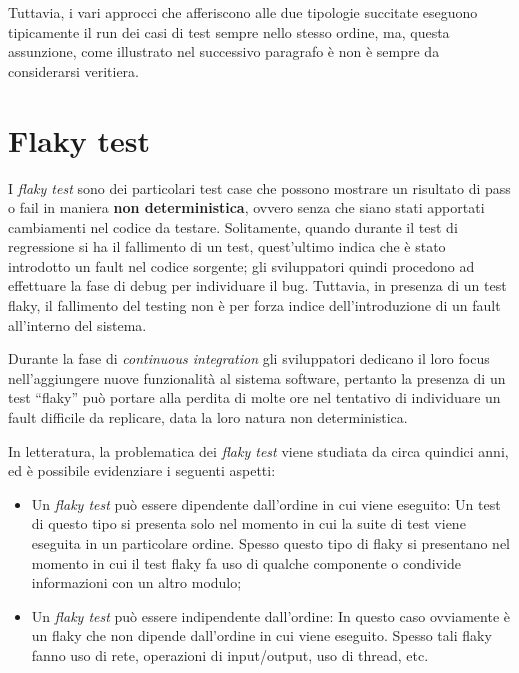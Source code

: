 Tuttavia, i vari approcci che afferiscono alle due tipologie succitate eseguono tipicamente il run dei casi di test sempre nello stesso ordine, ma, questa assunzione, come illustrato nel successivo paragrafo è non è sempre da considerarsi veritiera.
\section{Flaky test}
I \emph{flaky test} sono dei particolari test case che possono mostrare un risultato di pass o fail in maniera \textbf{non deterministica}, ovvero senza che siano stati apportati cambiamenti nel codice da testare.\cite{shi2019ifixflakies} Solitamente, quando durante il test di regressione si ha il fallimento di un test, quest’ultimo indica che è stato introdotto
un fault nel codice sorgente; gli sviluppatori quindi procedono ad effettuare la fase
di debug per individuare il bug. Tuttavia, in presenza di un test flaky, il fallimento del testing non è per forza indice dell’introduzione di un fault all’interno del
sistema.

Durante la fase di \emph{continuous integration} gli sviluppatori dedicano il loro focus nell’aggiungere nuove funzionalità al sistema software, pertanto la presenza
di un test “flaky” può portare alla perdita di molte ore nel tentativo di individuare
un fault difficile da replicare, data la loro natura non deterministica.

In letteratura, la problematica dei \emph{flaky test} viene studiata da circa quindici anni, ed è possibile evidenziare i seguenti aspetti:
\begin{itemize}
	\item Un \emph{flaky test} può essere dipendente dall’ordine in cui viene eseguito: Un test di questo tipo si presenta solo nel momento in cui la suite di test viene eseguita in un particolare ordine. Spesso questo tipo di flaky si presentano nel momento in cui il test flaky fa uso di qualche componente o condivide informazioni con un altro modulo;
	\item Un \emph{flaky test} può essere indipendente dall’ordine: In questo caso ovviamente è un flaky che non dipende dall’ordine in cui viene eseguito. Spesso tali flaky fanno uso di rete, operazioni di input/output, uso di thread, etc.
\end{itemize}


